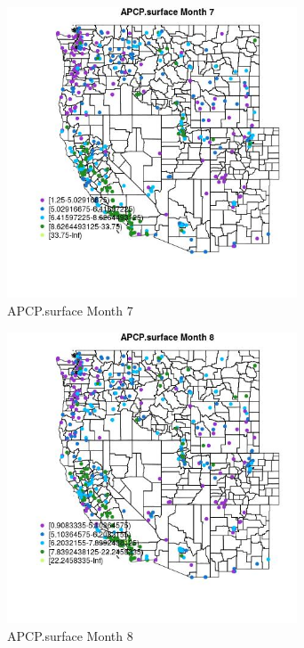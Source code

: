 \begin{figure} 
\centering  
\includegraphics[width=0.77\textwidth]{Code_Outputs/ML_input_report_ML_input_PM25_Step5_part_d_de_duplicated_aves_ML_input_MapObsMo7APCPsurface.jpg} 
\caption{\label{fig:ML_input_report_ML_input_PM25_Step5_part_d_de_duplicated_aves_ML_inputMapObsMo7APCPsurface}APCP.surface Month 7} 
\end{figure} 
 

\begin{figure} 
\centering  
\includegraphics[width=0.77\textwidth]{Code_Outputs/ML_input_report_ML_input_PM25_Step5_part_d_de_duplicated_aves_ML_input_MapObsMo8APCPsurface.jpg} 
\caption{\label{fig:ML_input_report_ML_input_PM25_Step5_part_d_de_duplicated_aves_ML_inputMapObsMo8APCPsurface}APCP.surface Month 8} 
\end{figure} 
 

